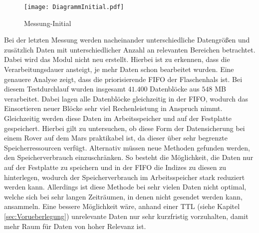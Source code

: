 \begin{figure}[H]
	\centering
	\texttt{[image: DiagrammInitial.pdf]}
	\label{fig:diagrammInitial}
	\caption{Messung-Initial}
\end{figure}

Bei der letzten Messung werden nacheinander unterschiedliche
Datengrößen und zusätzlich Daten mit unterschiedlicher Anzahl an relevanten
Bereichen betrachtet. Dabei wird das Modul nicht neu erstellt. Hierbei ist zu
erkennen, dass die Verarbeitungsdauer ansteigt, je mehr Daten schon bearbeitet
wurden. Eine genauere Analyse zeigt, dass die priorisierende \gls{FIFO} der
Flaschenhals ist. Bei diesem Testdurchlauf wurden insgesamt $41.400$ Datenblöcke
aus $548$ MB verarbeitet.
Dabei lagen alle Datenblöcke gleichzeitig in der \gls{FIFO}, wodurch das Einsortieren neuer
Blöcke sehr viel Rechenleistung in Anspruch nimmt. Gleichzeitig werden diese
Daten im Arbeitsspeicher und auf der Festplatte gespeichert. Hierbei gilt zu
untersuchen, ob diese Form der Datensicherung bei einem Rover auf dem
Mars praktikabel ist, da dieser über sehr begrenzte Speicherressourcen verfügt.
Alternativ müssen neue Methoden gefunden werden, den Speicherverbrauch
einzuschränken. So besteht die Möglichkeit, die Daten nur auf der Festplatte
zu speichern und in der \gls{FIFO} die Indizes zu diesen zu hinterlegen,
wodurch der Speicherverbrauch im Arbeitsspeicher stark reduziert werden kann.
Allerdings ist diese Methode bei sehr vielen Daten nicht optimal, welche sich
bei sehr langen Zeiträumen, in denen nicht gesendet werden kann, ansammeln.
Eine bessere Möglichkeit wäre, anhand einer \gls{TTL} (siehe Kapitel
\ref{sec:Vorueberlegung}) unrelevante Daten nur sehr kurzfristig vorzuhalten,
damit mehr Raum für Daten von hoher Relevanz ist.
